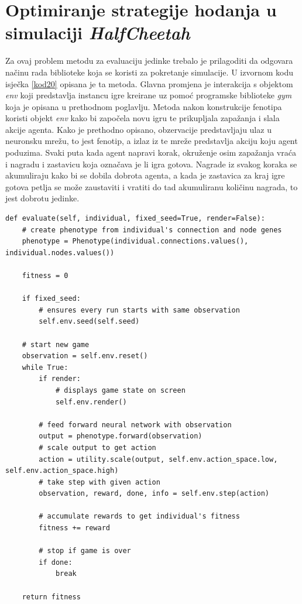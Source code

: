 \documentclass[times, utf8, diplomski, numeric]{fer}
\begin{document}
\section{Optimiranje strategije hodanja u simulaciji \textit{HalfCheetah}}
Za ovaj problem metodu za evaluaciju jedinke trebalo je prilagoditi da odgovara načinu rada biblioteke koja se koristi za pokretanje simulacije. U izvornom kodu isječka \ref{kod20} opisana je ta metoda. Glavna promjena je interakcija s objektom \textit{env} koji predstavlja instancu igre kreirane uz pomoć programske biblioteke \textit{gym} koja je opisana u prethodnom poglavlju. Metoda nakon konstrukcije fenotipa koristi objekt \textit{env} kako bi započela novu igru te prikupljala zapažanja i slala akcije agenta. Kako je prethodno opisano, obzervacije predstavljaju ulaz u neuronsku mrežu, to jest fenotip, a izlaz iz te mreže predstavlja akciju koju agent poduzima. Svaki puta kada agent napravi korak, okruženje osim zapažanja vraća i nagradu i zastavicu koja označava je li igra gotova. Nagrade iz svakog koraka se akumuliraju kako bi se dobila dobrota agenta, a kada je zastavica za kraj igre gotova petlja se može zaustaviti i vratiti do tad akumuliranu količinu nagrada, to jest dobrotu jedinke.

\begin{lstlisting}[frame=single, label=kod20, caption=Izvorni tekst metode \textit{evaluate} za problem optimiranja strategije hodanja u simulaciji \textit{HalfCheetah}]
def evaluate(self, individual, fixed_seed=True, render=False):
	# create phenotype from individual's connection and node genes
	phenotype = Phenotype(individual.connections.values(), individual.nodes.values())

	fitness = 0

	if fixed_seed:
		# ensures every run starts with same observation
		self.env.seed(self.seed)

	# start new game
	observation = self.env.reset()
	while True:
		if render:
			# displays game state on screen
			self.env.render()

		# feed forward neural network with observation
		output = phenotype.forward(observation)
		# scale output to get action
		action = utility.scale(output, self.env.action_space.low, self.env.action_space.high)
		# take step with given action
		observation, reward, done, info = self.env.step(action)

		# accumulate rewards to get individual's fitness
		fitness += reward

		# stop if game is over
		if done:
			break

	return fitness
\end{lstlisting}
\end{document}
